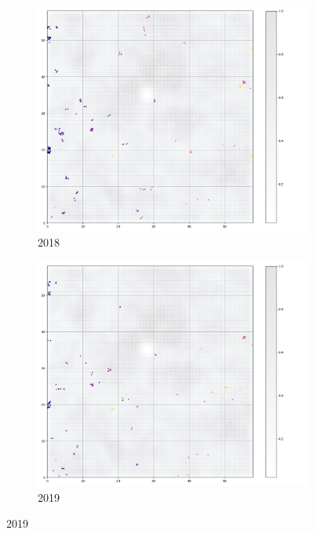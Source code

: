 \begin{figure}
     \centering
     \begin{subfigure}[b]{0.45\textwidth}
         \centering
         \includegraphics[width=\textwidth]{figures/NFLX_18.png}
         \caption{2018}
     \end{subfigure}
     \hfill
     \begin{subfigure}[b]{0.45\textwidth}
         \centering
         \includegraphics[width=\textwidth]{figures/NFLX_19.png}
         \caption{2019}
     \end{subfigure}

\end{figure}
